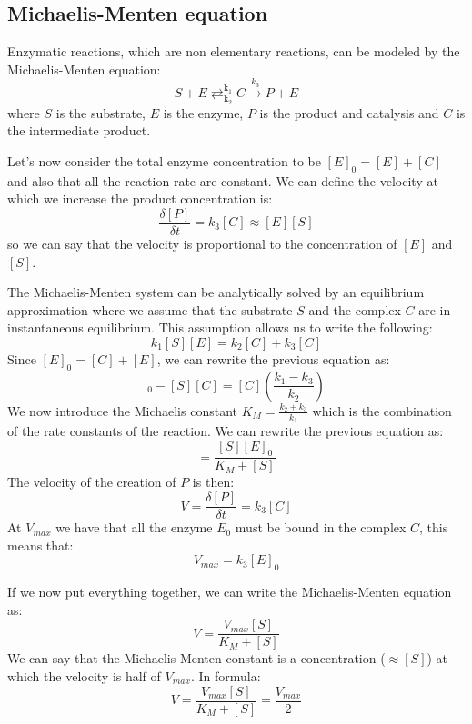 \subsection{Michaelis-Menten equation}
Enzymatic reactions, which are non elementary reactions, can be modeled by the
Michaelis-Menten equation:
\begin{equation}
    S + E \mathrel{\mathop{\rightleftarrows}^{\mathrm{k_1}}_{\mathrm{k_2}}} C \xrightarrow{k_3} P + E
\end{equation}
where $S$ is the substrate, $E$ is the enzyme, $P$ is the product and catalysis
and $C$ is the intermediate product.

Let's now consider the total enzyme concentration to be $[E]_0 = [E] + [C]$ and
also that all the reaction rate are constant. We can define the velocity at which
we increase the product concentration is:
\begin{equation}
    \frac{\delta [P]}{\delta t} = k_3 [C] \approx [E][S]
\end{equation}
so we can say that the velocity is proportional to the concentration of $[E]$ and
$[S]$.

The Michaelis-Menten system can be analytically solved by an equilibrium
approximation where we assume that the substrate $S$ and the complex $C$ are in
instantaneous equilibrium. This assumption allows us to write the following:
\begin{equation}
    k_1[S][E] = k_2[C] + k_3[C]
\end{equation}
Since $[E]_0 = [C] + [E]$, we can rewrite the previous equation as:
\begin{equation}
    [S][E]_0 - [S][C] = [C]\left( \frac{k_1 - k_3}{k_2}\right)
\end{equation}
We now introduce the Michaelis constant $K_M = \frac{k_2 + k_3}{k_1}$ which is
the combination of the rate constants of the reaction. We can rewrite the previous
equation as:
\begin{equation}
    [C] = \frac{[S][E]_0}{K_M + [S]}
\end{equation}
The velocity of the creation of $P$ is then:
\begin{equation}
    V = \frac{\delta [P]}{\delta t} = k_3[C]
\end{equation}
At $V_{max}$ we have that all the enzyme $E_0$ must be bound in the complex $C$,
this means that:
\begin{equation}
    V_{max} = k_3[E]_0
\end{equation}

If we now put everything together, we can write the Michaelis-Menten equation as:
\begin{equation}
    V = \frac{V_{max}[S]}{K_M + [S]}
\end{equation}
We can say that the Michaelis-Menten constant is a concentration ($\approx [S]$)
at which the velocity is half of $V_{max}$. In formula:
\begin{equation}
    V = \frac{V_{max}[S]}{K_M + [S]} = \frac{V_{max}}{2}
\end{equation}
